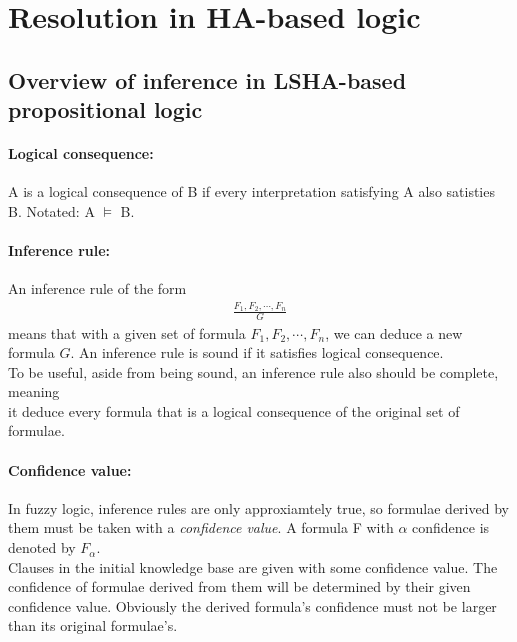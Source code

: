 \documentclass[part1.tex]{subfiles}
\begin{document}
\section{Resolution in HA-based logic}
\subsection{Overview of inference in LSHA-based propositional logic}
\paragraph{Logical consequence:} A is a logical consequence of B if every interpretation 
satisfying A also satisties B. Notated: A \(\models\) B.\\
\paragraph{Inference rule:} An inference rule of the form\\
\begin{align*}
	\frac{F_1, F_2,\cdots,F_n}{G}
\end{align*}
means that with a given set of formula \(F_1,F_2,\cdots,F_n\), we can deduce a 
new formula \(G\). An inference rule is sound if it satisfies logical consequence.\\
To be useful, aside from being sound, an inference rule also should be complete, meaning\\
it deduce every formula that is a logical consequence of the original set of formulae.\\
\paragraph{Confidence value:}
In fuzzy logic, inference rules are only approxiamtely true, so formulae derived by them must be
taken with a {\em confidence value}. A formula F with \(\alpha\) confidence is denoted by \(F_\alpha\).\\

Clauses in the initial knowledge base are given with some confidence value. The confidence of formulae
derived from them will be determined by their given confidence value. Obviously the derived formula's 
confidence must not be larger than its original formulae's.
\end{document}
